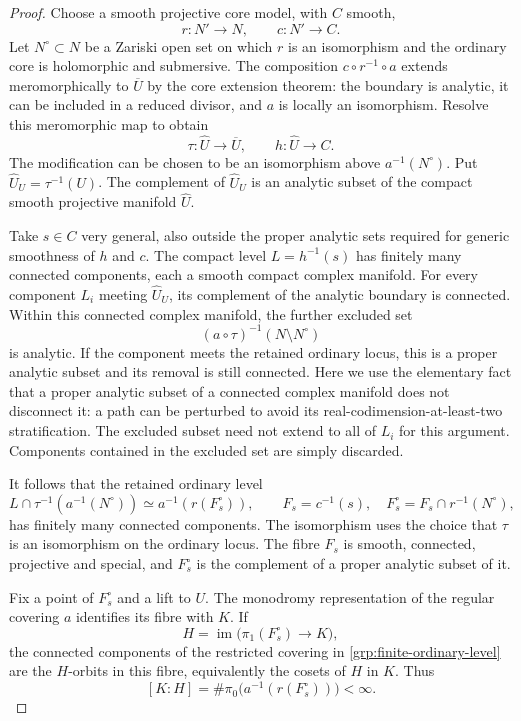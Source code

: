 \begin{proof}
Choose a smooth projective core model, with $C$ smooth,
\[
 r:N'\longrightarrow N,\qquad c:N'\longrightarrow C.
\]
Let $N^\circ\subset N$ be a Zariski open set on which $r$ is an
isomorphism and the ordinary core is holomorphic and submersive.
The composition $c\circ r^{-1}\circ a$ extends meromorphically to
$\overline U$ by the core extension theorem: the boundary is analytic,
it can be included in a reduced divisor, and $a$ is locally an
isomorphism.  Resolve this meromorphic map to obtain
\[
 \tau:\widehat U\longrightarrow\overline U,
 \qquad h:\widehat U\longrightarrow C.
\]
The modification can be chosen to be an isomorphism above
$a^{-1}(N^\circ)$.  Put $\widehat U_U=\tau^{-1}(U)$.
The complement of $\widehat U_U$ is an analytic subset of the compact
smooth projective manifold $\widehat U$.

Take $s\in C$ very general, also outside the proper analytic sets
required for generic smoothness of $h$ and $c$.  The compact level
$L=h^{-1}(s)$ has finitely many connected components, each a smooth
compact complex manifold.  For every component $L_i$ meeting
$\widehat U_U$, its complement of the analytic boundary is connected.
Within this connected complex manifold, the further excluded set
\[
 (a\circ\tau)^{-1}(N\setminus N^\circ)
\]
is analytic.  If the component meets the retained ordinary locus,
this is a proper analytic subset and its removal is still connected.
Here we use the elementary fact that a proper analytic subset of a
connected complex manifold does not disconnect it: a path can be
perturbed to avoid its real-codimension-at-least-two stratification.
The excluded subset need not extend to all of $L_i$ for this argument.
Components contained in the excluded set are simply discarded.

It follows that the retained ordinary level
\begin{equation}\label{grp:finite-ordinary-level}
 L\cap\tau^{-1}(a^{-1}(N^\circ))
 \simeq a^{-1}(r(F_s^\circ)),
 \qquad
 F_s=c^{-1}(s),\quad F_s^\circ=F_s\cap r^{-1}(N^\circ),
\end{equation}
has finitely many connected components.  The isomorphism uses the
choice that $\tau$ is an isomorphism on the ordinary locus.  The fibre
$F_s$ is smooth, connected, projective and special, and $F_s^\circ$ is
the complement of a proper analytic subset of it.

Fix a point of $F_s^\circ$ and a lift to $U$.  The monodromy
representation of the regular covering $a$ identifies its fibre with
$K$.  If
\[
 H=\operatorname{im}\bigl(\pi_1(F_s^\circ)\longrightarrow K\bigr),
\]
the connected components of the restricted covering in
\eqref{grp:finite-ordinary-level} are the $H$-orbits in this fibre,
equivalently the cosets of $H$ in $K$.  Thus
\begin{equation}\label{grp:index-equals-components}
 [K:H]=\#\pi_0\bigl(a^{-1}(r(F_s^\circ))\bigr)<\infty.
\end{equation}


\end{proof}

